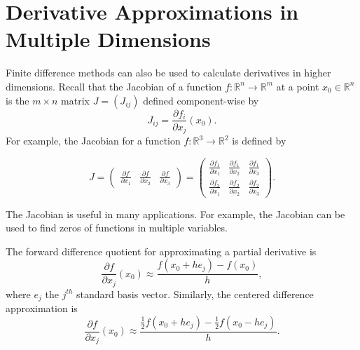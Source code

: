 \section*{Derivative Approximations in Multiple Dimensions}
Finite difference methods can also be used to calculate derivatives in higher dimensions.
Recall that the Jacobian of a function $f:\mathbb{R}^n \rightarrow \mathbb{R}^m$ at a point $x_0 \in \mathbb{R}^n$ is the $m \times n$ matrix $J = (J_{ij})$ defined component-wise by
\begin{equation*}
J_{ij} = \frac{\partial f_i}{\partial x_j}(x_0).
\end{equation*}
For example, the Jacobian for a function $f:\mathbb{R}^3 \rightarrow \mathbb{R}^2$ is defined by

\[
J = \begin{pmatrix}
\frac{\partial f}{\partial x_1}&\frac{\partial f}{\partial x_2}&\frac{\partial f}{\partial x_3}
\end{pmatrix}
= \begin{pmatrix}
\frac{\partial f_1}{\partial x_1}&\frac{\partial f_1}{\partial x_2}&\frac{\partial f_1}{\partial x_3}\\
\frac{\partial f_2}{\partial x_1}&\frac{\partial f_2}{\partial x_2}&\frac{\partial f_2}{\partial x_3}
\end{pmatrix}.
\]

The Jacobian is useful in many applications.  For example, the Jacobian can be used to find zeros of functions in multiple variables.



The forward difference quotient for approximating a partial derivative is
\begin{equation*}
\frac{\partial f}{\partial x_j} (x_0) \approx \frac{f(x_0+h e_j)-f(x_0)}{h},
\end{equation*}
where $e_j$ the $j^{th}$ standard basis vector. 
Similarly, the centered difference approximation is
\begin{equation*}
\frac{\partial f}{\partial x_j} (x_0) \approx \frac{\frac{1}{2}f(x_0+h e_j)-\frac{1}{2}f(x_0-h e_j)}{h}.
\end{equation*}

